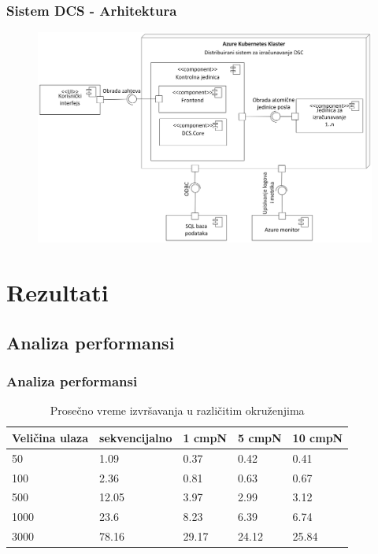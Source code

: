 \documentclass[11pt]{beamer}
\begin{document}
\begin{frame}
	\frametitle{Sistem DCS - Arhitektura}
	
	\begin{figure}
		\includegraphics[width=0.9\linewidth]{./images/arhitektura_sistema_dijagram_komponenti.png}
	\end{figure}
\end{frame}


\section{Rezultati}

\subsection{Analiza performansi}

\begin{frame}
	\frametitle{Analiza performansi}
	
	\begin{table}
		\begin{tabular}{ll l l l}
			\toprule
			\textbf{Veličina ulaza} & \textbf{sekvencijalno} & \textbf{1 cmpN} & \textbf{5 cmpN} & \textbf{10 cmpN}\\
			\midrule
			 50 & 1.09 & 0.37 & 0.42 & 0.41 \\ 
			 100 & 2.36 & 0.81 & 0.63 & 0.67 \\ 
			 500 & 12.05 & 3.97 & 2.99 & 3.12 \\ 
			 1000 & 23.6 & 8.23 & 6.39 & 6.74 \\ 
			 3000 & 78.16 & 29.17 & 24.12 & 25.84 \\ 
			\bottomrule
		\end{tabular}
		\caption{Prosečno vreme izvršavanja u različitim okruženjima}
	\end{table}
\end{frame}
\end{document}
